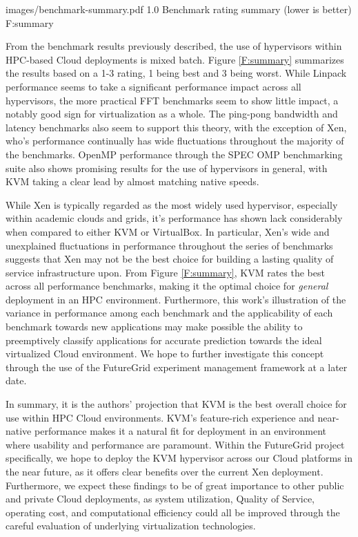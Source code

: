   {images/benchmark-summary.pdf}
  {1.0}
  {Benchmark rating summary (lower is better)}
  {F:summary}


From the benchmark results previously described, the use of hypervisors within HPC-based Cloud deployments is mixed batch.  Figure \ref{F:summary} summarizes the results based on a 1-3 rating, 1 being best and 3 being worst.   While Linpack performance seems to take a significant performance impact across all hypervisors, the more practical FFT benchmarks seem to show little impact, a notably good sign for virtualization as a whole.  The ping-pong bandwidth and latency benchmarks also seem to support this theory, with the exception of Xen, who's performance continually  has wide fluctuations throughout the majority of the benchmarks.  OpenMP performance through the SPEC OMP benchmarking suite also shows promising results for the use of hypervisors in general, with KVM taking a clear lead by almost matching native speeds. 

While Xen is typically regarded as the most widely used hypervisor, especially within academic clouds and grids, it's performance has shown lack considerably when compared to either KVM or VirtualBox.  In particular, Xen's wide and unexplained fluctuations in performance throughout the series of benchmarks suggests that Xen may not be the best choice for building a lasting quality of service infrastructure upon. From Figure \ref{F:summary}, KVM rates the best across all performance benchmarks, making it the optimal choice for {\em general} deployment in an HPC environment.  Furthermore, this work's illustration of the variance in performance among each benchmark and the applicability of each benchmark towards new applications may make possible the ability to preemptively classify applications for accurate prediction towards the ideal virtualized Cloud environment. We hope to further investigate this concept through the use of the FutureGrid experiment management framework at a later date.


In summary, it is the authors' projection that KVM is the best overall choice for use within HPC Cloud environments. KVM's feature-rich experience and near-native performance makes it a natural fit for deployment in an environment where usability and performance are paramount.  Within the FutureGrid project specifically, we hope to deploy the KVM hypervisor across our Cloud platforms in the near future, as it offers clear benefits over the current Xen deployment.  Furthermore, we expect these findings to be of great importance to other public and private Cloud deployments, as system utilization, Quality of Service, operating cost, and computational efficiency could all be improved through the careful evaluation of underlying virtualization technologies. 





